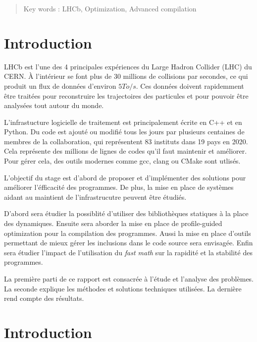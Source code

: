 \documentclass[a4paper]{report}
\begin{document}
\begin{otherlanguage}{english}
\begin{abstract}

    \vfill

    Key words : LHCb, Optimization, Advanced compilation
\end{abstract}
\end{otherlanguage}


\chapter*{Introduction}
    LHCb est l'une des 4 principales expériences du Large Hadron Collider (LHC) du CERN.
    À l'intérieur se font plus de 30 millions de collisions par secondes, ce qui produit un flux de données d'environ $5 To/s$.
    Ces données doivent rapidemment être traitées pour reconstruire les trajectoires des particules et pour pouvoir être analysées tout autour du monde.

    L'infrastucture logicielle de traitement est principalement écrite en C++ et en Python.
    Du code est ajouté ou modifié tous les jours par plusieurs centaines de membres de la collaboration, qui représentent 83 instituts dans 19 pays en 2020.
    Cela représente des millions de lignes de codes qu'il faut maintenir et améliorer.
    Pour gérer cela, des outils modernes comme gcc, clang ou CMake sont utlisés.

    L'objectif du stage est d'abord de proposer et d'implémenter des solutions pour améliorer l'éfficacité des programmes.
    De plus, la mise en place de systèmes aidant au maintient de l'infrastrucutre peuvent être étudiés.

    D'abord sera étudier la possiblité d'utiliser des bibliothèques statiques à la place des dynamiques.
    Ensuite sera aborder la mise en place de profile-guided optimization pour la compilation des programmes.
    Aussi la mise en place d'outils permettant de mieux gérer les inclusions dans le code source sera envisagée.
    Enfin sera étudier l'impact de l'utilisation du \emph{fast math} sur la rapidité et la stabilité des programmes.

    La première parti de ce rapport est consacrée à l'étude et l'analyse des problèmes.
    La seconde explique les méthodes et solutions techniques utilisées.
    La dernière rend compte des résultats.


\chapter{Introduction}
\end{document}
